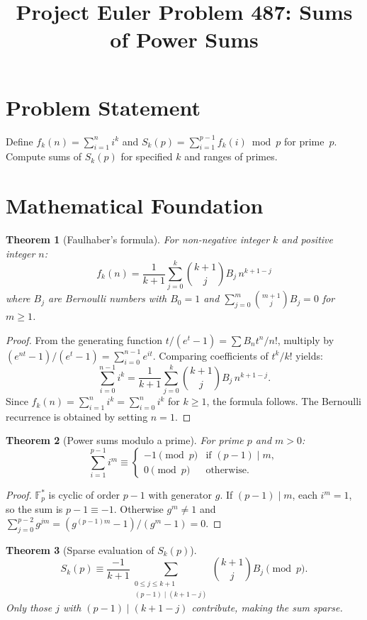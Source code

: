 \documentclass[12pt]{article}
\title{Project Euler Problem 487: Sums of Power Sums}
\author{}
\date{}
\newtheorem{theorem}{Theorem}
\begin{document}
\maketitle

\section{Problem Statement}
Define $f_k(n) = \sum_{i=1}^n i^k$ and $S_k(p) = \sum_{i=1}^{p-1}f_k(i)\bmod p$ for prime~$p$. Compute sums of $S_k(p)$ for specified $k$ and ranges of primes.

\section{Mathematical Foundation}

\begin{theorem}[Faulhaber's formula]
For non-negative integer $k$ and positive integer $n$:
\[
f_k(n) = \frac{1}{k+1}\sum_{j=0}^k\binom{k+1}{j}B_j\,n^{k+1-j}
\]
where $B_j$ are Bernoulli numbers with $B_0=1$ and $\sum_{j=0}^m\binom{m+1}{j}B_j=0$ for $m\ge 1$.
\end{theorem}

\begin{proof}
From the generating function $t/(e^t-1) = \sum B_n t^n/n!$, multiply by $(e^{nt}-1)/(e^t-1) = \sum_{i=0}^{n-1}e^{it}$. Comparing coefficients of $t^k/k!$ yields:
\[
\sum_{i=0}^{n-1}i^k = \frac{1}{k+1}\sum_{j=0}^k\binom{k+1}{j}B_j\,n^{k+1-j}.
\]
Since $f_k(n)=\sum_{i=1}^n i^k = \sum_{i=0}^n i^k$ for $k\ge 1$, the formula follows. The Bernoulli recurrence is obtained by setting $n=1$.
\end{proof}

\begin{theorem}[Power sums modulo a prime]
For prime $p$ and $m>0$:
\[
\sum_{i=1}^{p-1}i^m \equiv \begin{cases} -1\pmod{p} & \text{if }(p-1)\mid m,\\ 0\pmod{p} & \text{otherwise.}\end{cases}
\]
\end{theorem}

\begin{proof}
$\mathbb{F}_p^*$ is cyclic of order $p-1$ with generator $g$. If $(p-1)\mid m$, each $i^m=1$, so the sum is $p-1\equiv -1$. Otherwise $g^m\ne 1$ and $\sum_{j=0}^{p-2}g^{jm} = (g^{(p-1)m}-1)/(g^m-1) = 0$.
\end{proof}

\begin{theorem}[Sparse evaluation of $S_k(p)$]
\[
S_k(p) \equiv \frac{-1}{k+1}\sum_{\substack{0\le j\le k+1\\(p-1)\mid(k+1-j)}}\binom{k+1}{j}B_j \pmod{p}.
\]
Only those $j$ with $(p-1)\mid(k+1-j)$ contribute, making the sum sparse.
\end{theorem}
\end{document}
